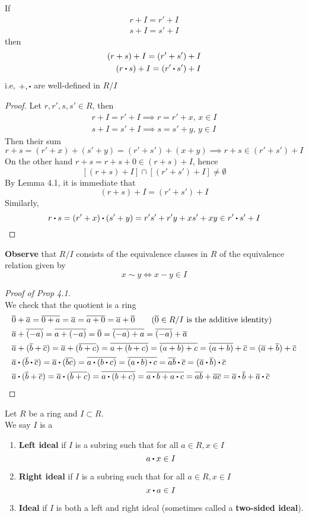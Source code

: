 \documentclass[../Main.tex]{subfiles}
\begin{document}
\begin{lem}
	If
	\begin{align*}
		r+I = r'+I\\
		s+I = s'+I
	\end{align*}
	then
	\begin{align*}
		(r+s)+I = (r'+s')+I\\
		(r\rdot s)+I = (r'\rdot s')+I
	\end{align*}
	i.e, $+,\rdot $ are well-defined in $R/I$
\end{lem}
\begin{proof}
	Let $r,r',s,s' \in R$, then
	\begin{align*}
		r+I=r'+I \implies r=r'+x,\, x\in I\\
		s+I=s'+I \implies s=s'+y,\, y\in I
	\end{align*}
	Then their sum
	\[r+s=(r'+x)+(s'+y)=(r'+s')+(x+y) \implies r+s\in (r'+s')+ I\]
	On the other hand $r+s=r+s+0 \in (r+s)+I$, hence
	\[[(r+s)+I]\cap [(r'+s')+I]\ne \emptyset \]
	By Lemma 4.1, it is immediate that
	\[(r+s)+I=(r'+s')+I\]
	Similarly,
	\[r\rdot s=(r'+x)\rdot (s'+y)=r's'+r'y+xs'+xy \in r'\rdot s'+I\]
\end{proof}
\newpage
\textbf{Observe} that	$R/I$ consists of the equivalence classes in $R$ of the equivalence relation given by
	\[x\sim y \Longleftrightarrow x-y \in I\]
\begin{proof}[Proof of Prop 4.1]~\\
	We check that the quotient is a ring
	\begin{align*}
	&\obar{0}+\obar{a}=\obar{0+a}=\obar{a}=\obar{a+0}=\obar{a}+\obar{0} \qquad (\obar{0}\in R/I \text{ is the additive identity})\\
	&\obar{a}+\obar{(-a)}=\obar{a+(-a)} =\obar{0} = \obar{(-a)+a}=\obar{(-a)}+\obar{a}\\
	&\obar{a}+(\obar{b}+\obar{c}) = \obar{a}+(\obar{b+c}) = \obar{a+(b+c)} = \obar{(a+b)+c} = \obar{(a+b)}+\obar{c}=(\obar{a}+\obar{b})+\obar{c}\\
	&\obar{a}\rdot (\obar{b}\rdot \obar{c})=\obar{a}\rdot (\obar{bc})=\obar{a\rdot (b\rdot c)}=\obar{(a\rdot b)\rdot c} = \obar{ab}\rdot \obar{c}=(\obar{a}\rdot \obar{b})\rdot \obar{c}\\
	&\obar{a}\rdot (\obar{b}+\obar{c})=\obar{a}\rdot (\obar{b+c})=\obar{a\rdot (b+c)}=\obar{a\rdot b+a\rdot c}=\obar{ab}+\obar{ac}=\obar{a}\rdot \obar{b}+\obar{a}\rdot \obar{c}
	\end{align*}
\end{proof}
\begin{dfn}[title=Ideal]
	Let $R$ be a ring and $I\subset R$.\\
	We say $I$ is a 
	\begin{enumerate}[label=(\roman*)]
		\item \textbf{Left ideal} if $I$ is a subring such that for all $a\in R, x\in I$
		\[a\rdot x \in I\]
		\item \textbf{Right ideal} if $I$ is a subring such that for all $a\in R, x\in I$
		\[x\rdot a \in I\]
		\item \textbf{Ideal} if $I$ is both a left and right ideal (sometimes called a \textbf{two-sided ideal}).
	\end{enumerate}
\end{dfn}
\end{document}
